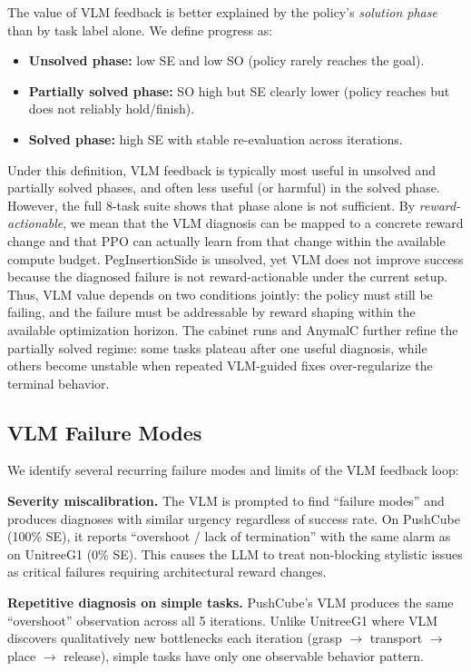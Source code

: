 \documentclass[conference]{IEEEtran}
\begin{document}
The value of VLM feedback is better explained by the policy's \emph{solution
phase} than by task label alone. We define progress as:
\begin{itemize}
  \item \textbf{Unsolved phase:} low SE and low SO (policy rarely reaches the goal).
  \item \textbf{Partially solved phase:} SO high but SE clearly lower (policy reaches but does not reliably hold/finish).
  \item \textbf{Solved phase:} high SE with stable re-evaluation across iterations.
\end{itemize}
Under this definition, VLM feedback is typically most useful in unsolved and
partially solved phases, and often less useful (or harmful) in the solved phase.
However, the full 8-task suite shows that phase alone is not sufficient. By
\emph{reward-actionable}, we mean that the VLM diagnosis can be mapped to a
concrete reward change and that PPO can actually learn from that change within
the available compute budget. PegInsertionSide is unsolved, yet VLM does not
improve success because the diagnosed failure is not reward-actionable under the
current setup. Thus, VLM value depends on two conditions jointly: the policy
must still be failing, and the failure must be addressable by reward shaping
within the available optimization horizon. The cabinet runs and AnymalC further
refine the partially solved regime: some tasks plateau after one useful
diagnosis, while others become unstable when repeated VLM-guided fixes
over-regularize the terminal behavior.

\subsection{VLM Failure Modes}

We identify several recurring failure modes and limits of the VLM feedback loop:

\textbf{Severity miscalibration.} The VLM is prompted to find ``failure modes''
and produces diagnoses with similar urgency regardless of success rate. On
PushCube (100\% SE), it reports ``overshoot / lack of termination'' with the
same alarm as on UnitreeG1 (0\% SE). This causes the LLM to treat non-blocking
stylistic issues as critical failures requiring architectural reward changes.

\textbf{Repetitive diagnosis on simple tasks.} PushCube's VLM produces the same
``overshoot'' observation across all 5 iterations. Unlike UnitreeG1 where VLM
discovers qualitatively new bottlenecks each iteration (grasp $\to$ transport
$\to$ place $\to$ release), simple tasks have only one observable behavior
pattern.
\end{document}
